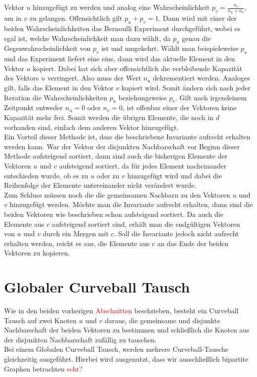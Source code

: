 Vektor $u$ hinzugefügt zu werden und analog eine Wahrscheinlichkeit $p_v = \frac{n_v}{n_u+n_v}$, um
in $v$ zu gelangen. Offensichtlich gilt $p_u + p_v = 1$. Dann wird mit einer der beiden
Wahrscheinlichkeiten das Bernoulli Experiment durchgeführt, wobei es egal ist, welche Wahrscheinlichkeit
man dazu wählt, da $p_u$ genau die Gegenwahrscheinlichkeit von $p_v$ ist und umgekehrt. 
Wählt man beispielsweise $p_u$ und das Experiment liefert eine eins, dann wird das aktuelle Element
in den Vektor $u$ kopiert. Dabei
hat sich aber offensichtlich die verbleibende Kapazität des Vektors $u$ verringert. Also muss
der Wert $n_u$ dekrementiert werden. Analoges gilt, falls das Element in den Vektor $v$ kopiert wird.
Somit ändern sich nach jeder Iteration die Wahrscheinlichkeiten $p_u$ beziehungsweise $p_v$.
Gilt nach irgendeinem Zeitpunkt entweder $n_u = 0$ oder $n_v = 0$, ist offenbar einer der Vektoren 
keine Kapazität mehr frei. Somit werden die übrigen Elemente, die noch in $d$ vorhanden sind, 
einfach dem anderen Vektor hinzugefügt.
\\
Ein Vorteil dieser Methode ist, dass die beschriebene Invariante aufrecht erhalten werden kann.
War der Vektor der disjunkten Nachbarschaft vor Beginn dieser Methode aufsteigend sortiert,
dann sind auch die bisherigen Elemente der Vektoren $u$ und $v$ aufsteigend sortiert, da für jedes
Element nacheinander entschieden wurde, ob es zu $u$ oder zu $v$ hinzugefügt wird und dabei die
Reihenfolge der Elemente untereinander nicht verändert wurde.
\\
Zum Schluss müssen noch die die gemeinsamen Nachbarn zu den Vektoren $u$ und $v$ hinzugefügt werden.
Möchte man die Invariante aufrecht erhalten, dann sind die beiden Vektoren wie beschrieben schon
aufsteigend sortiert. Da auch die Elemente aus $c$ aufsteigend sortiert sind, erhält man
die endgültigen Vektoren von $u$ und $v$ durch ein Mergen mit $c$. Soll die Invariante jedoch
nicht aufrecht erhalten werden, reicht es aus, die Elemente aus $c$ an das Ende der beiden Vektoren
zu kopieren.




\section{Globaler Curveball Tausch}
Wie in den beiden vorherigen \textcolor{red}{Abschnitten} beschrieben, besteht ein Curveball Tausch auf zwei Knoten $u$ und $v$ daraus, die gemeinsame und disjunkte Nachbarschaft der beiden Vektoren zu bestimmen
und schließlich die Knoten aus der disjunkten Nachbarschaft zufällig zu tauschen.
\\
Bei einem Globalen Curveball Tausch, werden mehrere Curveball-Tausche gleichzeitig ausgeführt.
Hierbei wird ausgenutzt, dass wir ausschließlich bipartite Graphen betrachten \textcolor{red}{echt?}


